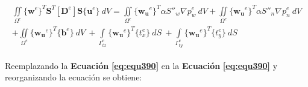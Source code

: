 \begin{ceqn} 
\begin{gather}\label{eq:equ391}
\begin{multlined}
\iint \limits_{\Omega^e} \{\mathbf{w}^e\}^T \mathbf{S}^T[\mathbf{D}^e]\mathbf{S}\{\mathbf{u}^e\}\ dV = 
\iint \limits_{\Omega^e} \{\mathbf{w_u}^e\}^T \alpha S''_w \nabla p_w^e\ dV +
\iint \limits_{\Omega^e} \{\mathbf{w_u}^e\}^T \alpha S''_n \nabla p_n^e\ dV  \\[10pt]
+ \iint \limits_{\Omega^e} \{\mathbf{w_u}^e\}^T \{\mathbf{b}^e\}\ dV\ +
\int \limits_{\Gamma^e_{tx}} \{\mathbf{w_u}^e\}^T \{t^e_x\}\ dS\ +
\int \limits_{\Gamma^e_{ty}} \{\mathbf{w_u}^e\}^T \{t^e_y\}\ dS
\end{multlined}
\end{gather}  
\end{ceqn}

Reemplazando la \textbf{Ecuación} \textbf{\ref{eq:equ390}} en la \textbf{Ecuación} \textbf{\ref{eq:equ390}} y reorganizando la ecuación se obtiene:


